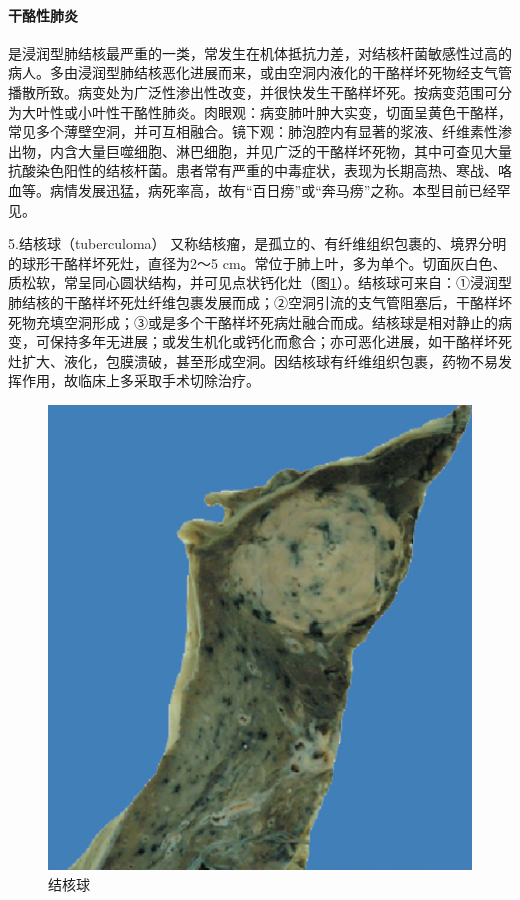 \paragraph{干酪性肺炎}
是浸润型肺结核最严重的一类，常发生在机体抵抗力差，对结核杆菌敏感性过高的病人。多由浸润型肺结核恶化进展而来，或由空洞内液化的干酪样坏死物经支气管播散所致。病变处为广泛性渗出性改变，并很快发生干酪样坏死。按病变范围可分为大叶性或小叶性干酪性肺炎。肉眼观：病变肺叶肿大实变，切面呈黄色干酪样，常见多个薄壁空洞，并可互相融合。镜下观：肺泡腔内有显著的浆液、纤维素性渗出物，内含大量巨噬细胞、淋巴细胞，并见广泛的干酪样坏死物，其中可查见大量抗酸染色阳性的结核杆菌。患者常有严重的中毒症状，表现为长期高热、寒战、咯血等。病情发展迅猛，病死率高，故有“百日痨”或“奔马痨”之称。本型目前已经罕见。

{5.结核球（tuberculoma）}
又称结核瘤，是孤立的、有纤维组织包裹的、境界分明的球形干酪样坏死灶，直径为2～5
cm。常位于肺上叶，多为单个。切面灰白色、质松软，常呈同心圆状结构，并可见点状钙化灶（图\ref{fig14-6}）。结核球可来自：①浸润型肺结核的干酪样坏死灶纤维包裹发展而成；②空洞引流的支气管阻塞后，干酪样坏死物充填空洞形成；③或是多个干酪样坏死病灶融合而成。结核球是相对静止的病变，可保持多年无进展；或发生机化或钙化而愈合；亦可恶化进展，如干酪样坏死灶扩大、液化，包膜溃破，甚至形成空洞。因结核球有纤维组织包裹，药物不易发挥作用，故临床上多采取手术切除治疗。

\begin{figure}[!htbp]
    \centering
    \includegraphics{./images/Image00230.jpg}
    \captionsetup{justification=centering}
    \caption{结核球}
    \label{fig14-6}
\end{figure}


